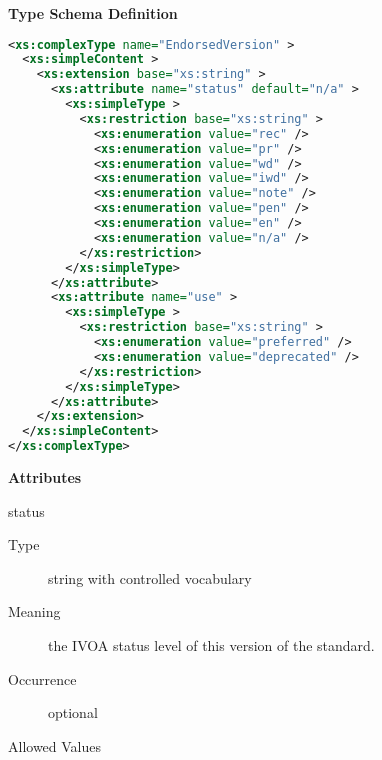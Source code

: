 \documentclass[11pt,a4paper]{ivoa}
\begin{document}
\begin{generated}
\begingroup
        \renewcommand*\descriptionlabel[1]{%
        \hbox to 5.5em{\emph{#1}\hfil}}\vspace{1ex}\noindent\textbf{ Type Schema Definition}

\begin{lstlisting}[language=XML,basicstyle=\footnotesize]
<xs:complexType name="EndorsedVersion" >
  <xs:simpleContent >
    <xs:extension base="xs:string" >
      <xs:attribute name="status" default="n/a" >
        <xs:simpleType >
          <xs:restriction base="xs:string" >
            <xs:enumeration value="rec" />
            <xs:enumeration value="pr" />
            <xs:enumeration value="wd" />
            <xs:enumeration value="iwd" />
            <xs:enumeration value="note" />
            <xs:enumeration value="pen" />
            <xs:enumeration value="en" />
            <xs:enumeration value="n/a" />
          </xs:restriction>
        </xs:simpleType>
      </xs:attribute>
      <xs:attribute name="use" >
        <xs:simpleType >
          <xs:restriction base="xs:string" >
            <xs:enumeration value="preferred" />
            <xs:enumeration value="deprecated" />
          </xs:restriction>
        </xs:simpleType>
      </xs:attribute>
    </xs:extension>
  </xs:simpleContent>
</xs:complexType>
\end{lstlisting}

\vspace{0.5ex}\noindent\textbf{ Attributes}

\begingroup\small\begin{bigdescription}
\item[status]
\begin{description}
\item[Type] string with controlled vocabulary
\item[Meaning]
                 the IVOA status level of this version of the standard.

\item[Occurrence] optional

\item[Allowed Values]\hfil
{}
\end{description}
\end{bigdescription}
\end{generated}
\end{document}
